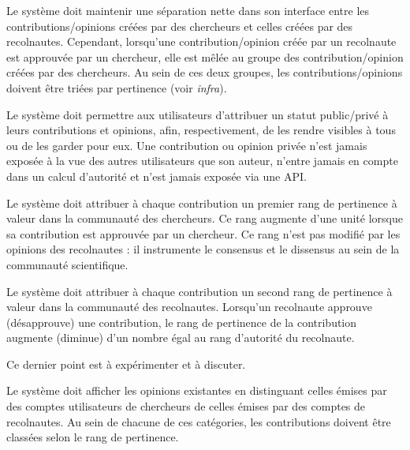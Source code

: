 \exig{}
Le système doit maintenir une séparation nette dans son interface entre les contributions/opinions créées par des chercheurs et celles créées par des recolnautes.
Cependant, lorsqu'une contribution/opinion créée par un recolnaute est approuvée par un chercheur, elle est mêlée au groupe des contribution/opinion créées par des chercheurs.
Au sein de ces deux groupes, les contributions/opinions doivent être triées par pertinence (voir {\em infra}).

\exig{}
Le système doit permettre aux utilisateurs d'attribuer un statut public/privé à leurs contributions et opinions, afin, respectivement, de les rendre visibles à tous ou de les garder pour eux.
Une contribution ou opinion privée n'est jamais exposée à la vue des autres utilisateurs que son auteur, n'entre jamais en compte dans un calcul d'autorité et n'est jamais exposée via une API.

\startsubsection[title={Pertinence des contributions}]

\exig{}
Le système doit attribuer à chaque contribution un premier rang de pertinence à valeur dans la communauté des chercheurs.
Ce rang augmente d'une unité lorsque sa contribution est approuvée par un chercheur.
Ce rang n'est pas modifié par les opinions des recolnautes : il instrumente le consensus et le dissensus au sein de la communauté scientifique.

\exig{}
Le système doit attribuer à chaque contribution un second rang de pertinence à valeur dans la communauté des recolnautes.
Lorsqu'un recolnaute approuve (désapprouve) une contribution, le rang de pertinence de la contribution augmente (diminue) d'un nombre égal au rang d'autorité du recolnaute.

\idea{} Ce dernier point est à expérimenter et à discuter.

\exig{}
Le système doit afficher les opinions existantes en distinguant celles émises par des comptes utilisateurs de chercheurs de celles émises par des comptes de recolnautes.
Au sein de chacune de ces catégories, les contributions doivent être classées selon le rang de pertinence.

\startsubsubsection[title={En dehors de R+}]


